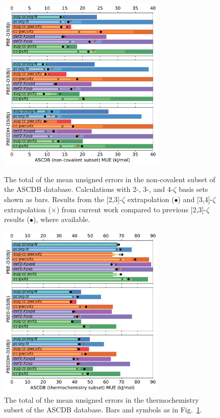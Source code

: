 \documentclass[12pt]{article}
\begin{document}
\clearpage
\begin{figure}[p]
    \centering
    \includegraphics[width=8cm]{../output/fig_ascdb_nc.pdf}
    \caption{The total of the mean unsigned errors in the non-covalent subset of the ASCDB database. Calculations with 2-, 3-, and 4-$\zeta$ basis sets shown as bars. Results from the [2,3]-$\zeta$ extrapolation ($\bullet$) and [3,4]-$\zeta$ extrapolation ($\times$) from current work compared to previous [2,3]-$\zeta$ results (\textcolor{C1}{$\bullet$}), where available. \label{fig:ascdb-nc}}
    \vspace{1em}
    \includegraphics[width=8cm]{../output/fig_ascdb_th.pdf}
    \caption{The total of the mean unsigned errors in the thermochemistry subset of the ASCDB database. Bars and symbols as in Fig.~\ref{fig:ascdb-nc}.}
\end{figure}
\end{document}
